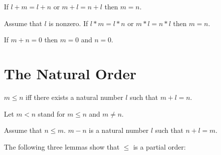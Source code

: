 \documentclass[11pt]{article}
\begin{document}
\begin{forthel}
\begin{axiom} If $l + m = l + n$ or $m + l = n + l$ 
then $m = n$.
\end{axiom}

\begin{axiom} Assume that $l$ is nonzero.
If $l * m = l * n$ or $m * l = n * l$ then $m = n$.
\end{axiom}

\begin{axiom} If $m + n = 0$ then $m = 0$ and $n = 0$.
\end{axiom}

\end{forthel}

\section{The Natural Order}

\begin{forthel}

\begin{definition} $m \leq n$ iff 
there exists a natural number $l$ such that  
$m + l = n$.
\end{definition}

Let $m < n$ stand for $m \leq n$ and $m \neq n$.

\begin{definition} Assume that $n \leq m$.
$m - n$ is a natural number $l$ such that $n + l  = m$.
\end{definition}

\end{forthel}

The following three lemmas show that $\leq$ is a partial order:
\end{document}
